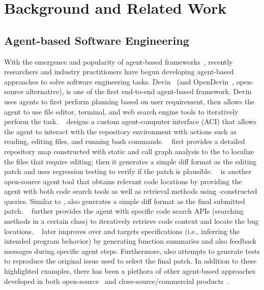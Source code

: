 \section{Background and Related Work}


\subsection{Agent-based Software Engineering}

With the emergence and popularity of agent-based frameworks~\cite{xi2023rise}, recently researchers and industry practitioners have begun developing agent-based approaches to solve software engineering tasks. 
Devin~\cite{devinwebpage} (and OpenDevin~\cite{opendevin}, open-source alternative), is one of the first end-to-end \llm agent-based framework.
Devin uses agents to first perform planning based on user requirement, then allows the agent to use file editor, terminal, and web search engine tools to iteratively perform the task.
\sweagent~\cite{sweagent} designs a custom agent-computer interface (ACI) that allows the \llm agent to interact with the repository environment with actions such as reading, editing files, and running bash commands. 
\aider~\cite{aidar} first provides a detailed repository map constructed with static and call graph analysis to the \llm to localize the files that require editing; then it generates a simple diff format as the editing patch and uses regression testing to verify if the patch is plausible.
\moatless~\cite{moatless} is another open-source agent tool that obtains relevant code locations by providing the agent with both code search tools as well as retrieval methods using \llm-constructed queries. 
Similar to \aider, \moatless also generates a simple diff format as the final submitted patch. 
\autocoderover~\cite{autocoderover} further provides the \llm agent with specific code search APIs (\eg searching methods in a certain class) to iteratively retrieve code context and {locate the bug locations}. 
\specrover~\cite{specrover} later improves over \autocoderover and targets specifications (i.e., inferring the intended program behavior) by generating function summaries and also feedback messages during specific agent steps. 
Furthermore, \specrover also attempts to generate \reproduction tests to reproduce the original issue used to select the final patch. 
In addition to these highlighted examples, there has been a plethora of other agent-based approaches developed in both open-source~\cite{aidar, repograph, appmapnavie, zhang2024diversity} and close-source/commercial products~\cite{bouzenia2024repairagent, coder, repounderstander, lingma, factorydroid, ibmagent, opencsgstarship, marscode, amazonqdeveloper, supercoder, gru, isoform, mentatbot, honeycomb, codestoryaide}.

